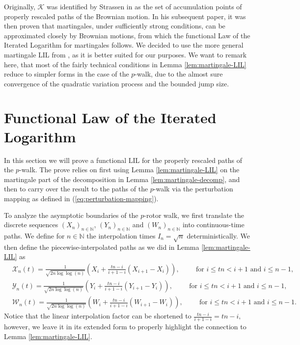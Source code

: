 \documentclass[11pt]{article}
\theoremstyle{remark}
\newcommand{\N}{\mathbb{N}}
\begin{document}
Originally, $\mathcal{K}$ was identified by Strassen in \cite{S64} as the set of accumulation points of properly rescaled paths of the Brownian motion. In his subsequent paper, \cite{S67} it was then proven that martingales, under sufficiently strong conditions, can be approximated closely by Brownian motions, from which the functional Law of the Iterated Logarithm for martingales follows. We decided to use the more general martingale LIL from \cite{HH80}, as it is better suited for our purposes. We want to remark here, that most of the fairly technical conditions in Lemma \ref{lem:martingale-LIL} reduce to simpler forms in the case of the $p$-walk, due to the almost sure convergence of the quadratic variation process and the bounded jump size.

\section{Functional Law of the Iterated Logarithm}\label{sec:func}
In this section we will prove a functional LIL for the properly rescaled paths of the $p$-walk. The prove relies on first using Lemma \ref{lem:martingale-LIL} on the martingale part of the decomposition in Lemma \ref{lem:martingale-decomp}, and then to carry over the result to the paths of the $p$-walk via the perturbation mapping as defined in (\ref{eq:perturbation-mapping}).

To analyze the asymptotic boundaries of the $p$-rotor walk, we first translate the discrete sequences $(X_n)_{n\in\N}$, $(Y_n)_{n\in\N}$ and $(W_n)_{n\in\N}$ into continuous-time paths. We define for $n\in\N$ the interpolation times $I_n=\sqrt{n}$ deterministically. We then define the piecewise-interpolated paths as we did in Lemma \ref{lem:martingale-LIL} as
\begin{align*}
    &\mathcal{X}_n(t)=\frac{1}{\sqrt{2n\log\log(n)}}\left(X_i+\frac{tn-i}{{i+1}-i}(X_{i+1}-X_i)\right),\hspace{1cm}\text{for }i\leq tn<{i+1}\text{ and }i\leq n-1,\\
    &\mathcal{Y}_n(t)=\frac{1}{\sqrt{2n\log\log(n)}}\left(Y_i+\frac{tn-i}{{i+1}-i}(Y_{i+1}-Y_i)\right),\hspace{1cm}\text{for }i\leq tn<{i+1}\text{ and }i\leq n-1,\\
    &\mathcal{W}_n(t)=\frac{1}{\sqrt{2n\log\log(n)}}\left(W_i+\frac{tn-i}{{i+1}-i}(W_{i+1}-W_i)\right),\hspace{1cm}\text{for }i\leq tn<{i+1}\text{ and }i\leq n-1.
\end{align*}
Notice that the linear interpolation factor can be shortened to
$\frac{tn-i}{i+1-i}=tn-i,$
however, we leave it in its extended form to properly highlight the connection to Lemma \ref{lem:martingale-LIL}.
\end{document}
